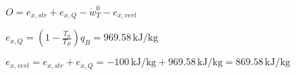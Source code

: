 \( O = e_{x,str} + e_{x,Q} - \dot{w}_T^0 - e_{x,verl} \)  

\( e_{x,Q} = (1 - \frac{T_0}{T_B}) q_B = 969.58 \, \text{kJ/kg} \)  

\( e_{x,verl} = e_{x,str} + e_{x,Q} = -100 \, \text{kJ/kg} + 969.58 \, \text{kJ/kg} = 869.58 \, \text{kJ/kg} \)